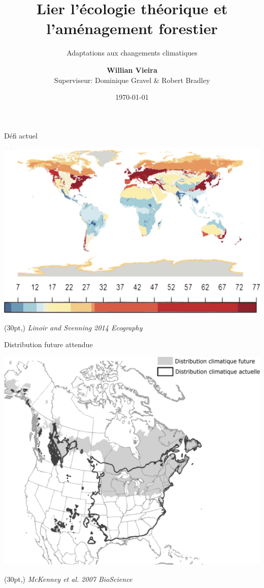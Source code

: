 \documentclass[11pt, compress, aspectratio=1610]{beamer}
\title{Lier l'écologie théorique et \newline l'aménagement forestier}
\subtitle{Adaptations aux changements climatiques}
\date{\today}
\author{\textbf{Willian Vieira}\\
Superviseur: Dominique Gravel \& Robert Bradley \newline}
\institute{}
\newcommand\smallcitation[1]{%
\begin{textblock*}{\textwidth}(30pt,\textheight)
	\raggedleft \footnotesize\textit{#1}
\end{textblock*}}
\begin{document}
\maketitle

\begin{frame}{Défi actuel}

\centering
 \includegraphics[scale=0.55]{figures/Lenoir.pdf}\par

\smallcitation{Linoir and Svenning 2014 Ecography}

\end{frame}

\begin{frame}{Distribution future attendue}

\centering
 \includegraphics[scale=0.4]{figures/mckenney.pdf}\par

\smallcitation{McKenney et al. 2007 BioScience}

\end{frame}
\end{document}
